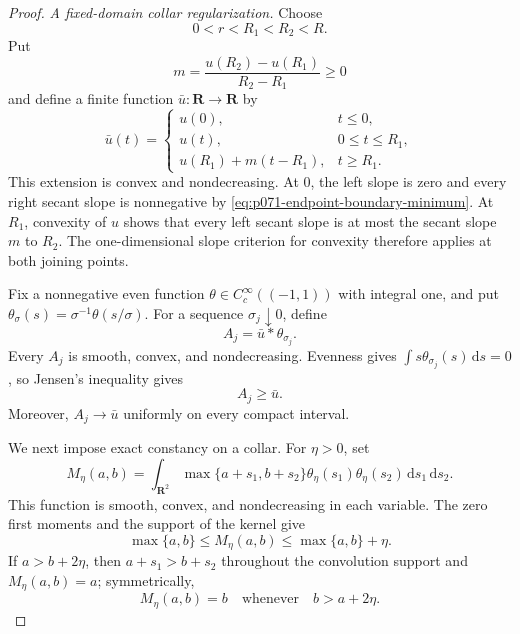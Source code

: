 \begin{proof}
\medskip\noindent\emph{A fixed-domain collar regularization.}
Choose
\[
                         0<r<R_1<R_2<R.
\]
Put
\[
                         m=
             \frac{u(R_2)-u(R_1)}{R_2-R_1}\geq0
\]
and define a finite function \(\bar u:\mathbf R\to\mathbf R\) by
\begin{equation}
 \bar u(t)=
 \begin{cases}
  u(0),&t\leq0,\\
  u(t),&0\leq t\leq R_1,\\
  u(R_1)+m(t-R_1),&t\geq R_1.
 \end{cases}
 \label{eq:p071-endpoint-convex-extension}
\end{equation}
This extension is convex and nondecreasing.  At \(0\), the left slope is
zero and every right secant slope is nonnegative by
\eqref{eq:p071-endpoint-boundary-minimum}.  At \(R_1\), convexity of
\(u\) shows that every left secant slope is at most the secant slope
\(m\) to \(R_2\).  The one-dimensional slope criterion for convexity
therefore applies at both joining points.

Fix a nonnegative even function
\(\theta\in C^\infty_c((-1,1))\) with integral one, and put
\(\theta_\sigma(s)=\sigma^{-1}\theta(s/\sigma)\).  For a sequence
\(\sigma_j\downarrow0\), define
\begin{equation}
                         A_j=\bar u*\theta_{\sigma_j}.
 \label{eq:p071-endpoint-convolution}
\end{equation}
Every \(A_j\) is smooth, convex, and nondecreasing.  Evenness gives
\(\int s\theta_{\sigma_j}(s)\,\mathrm ds=0\), so Jensen's inequality
gives
\begin{equation}
                              A_j\geq\bar u.
 \label{eq:p071-endpoint-convolution-dominates}
\end{equation}
Moreover, \(A_j\to\bar u\) uniformly on every compact interval.

We next impose exact constancy on a collar.  For \(\eta>0\), set
\begin{equation}
 M_\eta(a,b)=
 \int_{\mathbf R^2}
 \max\{a+s_1,b+s_2\}
 \theta_\eta(s_1)\theta_\eta(s_2)\,
 \mathrm ds_1\,\mathrm ds_2.
 \label{eq:p071-endpoint-regularized-maximum}
\end{equation}
This function is smooth, convex, and nondecreasing in each variable.
The zero first moments and the support of the kernel give
\begin{equation}
 \max\{a,b\}
 \leq M_\eta(a,b)
 \leq\max\{a,b\}+\eta.
 \label{eq:p071-endpoint-regularized-max-bounds}
\end{equation}
If \(a>b+2\eta\), then \(a+s_1>b+s_2\) throughout the convolution
support and \(M_\eta(a,b)=a\); symmetrically,
\begin{equation}
 M_\eta(a,b)=b
 \quad\text{whenever}\quad b>a+2\eta.
 \label{eq:p071-endpoint-regularized-max-truncation}
\end{equation}


\end{proof}
